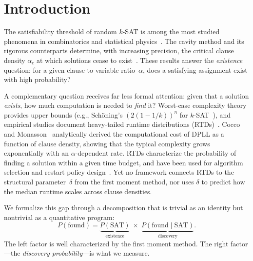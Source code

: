 \documentclass[11pt,a4paper]{article}
\newcommand{\Pfound}{P(\text{found})}
\newcommand{\PSAT}{P(\text{SAT})}
\newcommand{\PfSAT}{P(\text{found}\mid\text{SAT})}
\begin{document}
\section{Introduction}
\label{sec:intro}

The satisfiability threshold of random $k$-SAT is among the most studied
phenomena in combinatorics and statistical physics~\cite{MPZ2009}.
The cavity method and its rigorous counterparts determine, with increasing
precision, the critical clause density $\alpha_c$ at which solutions
cease to exist~\cite{Achlioptas2008,Ding2015}.
These results answer the \emph{existence} question:
for a given clause-to-variable ratio~$\alpha$, does a satisfying
assignment exist with high probability?

A complementary question receives far less formal attention:
given that a solution \emph{exists}, how much computation is needed
to \emph{find} it?
Worst-case complexity theory provides upper bounds
(e.g., Sch\"oning's $(2(1-1/k))^n$ for $k$-SAT~\cite{Schoening1999}),
and empirical studies document heavy-tailed runtime
distributions (RTDs)~\cite{Gomes2000,Coarfa2003,Hoos1999,Frost1997}.
Cocco and Monasson~\cite{CoccoMonasson2001} analytically derived
the computational cost of DPLL as a function of clause density,
showing that the typical complexity grows exponentially with an
$\alpha$-dependent rate.
RTDs characterize the probability of finding a solution within
a given time budget, and have been used for algorithm selection
and restart policy design~\cite{Hoos1999}.
Yet no framework connects RTDs to the structural parameter~$\delta$
from the first moment method, nor uses $\delta$ to predict how
the median runtime scales across clause densities.

We formalize this gap through a decomposition that is trivial
as an identity but nontrivial as a quantitative program:
\begin{equation}
\label{eq:decomposition}
\Pfound = \underbrace{\PSAT}_{\text{existence}} \;\times\;
          \underbrace{\PfSAT}_{\text{discovery}}.
\end{equation}
The left factor is well characterized by the first moment method.
The right factor---the \emph{discovery probability}---is what we
measure.
\end{document}
